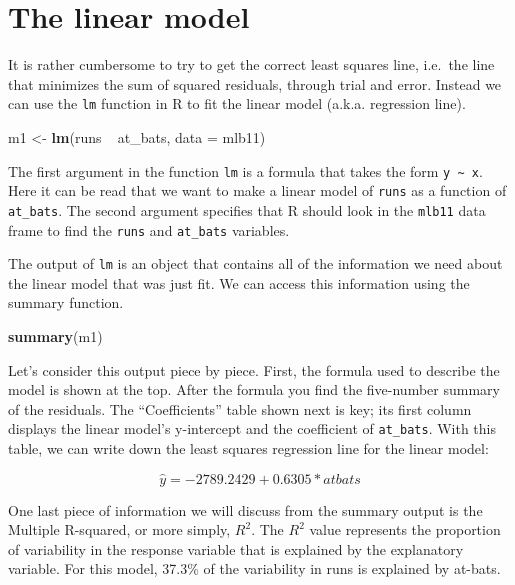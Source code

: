 \documentclass[]{book}
\newenvironment{Shaded}{\begin{snugshade}}{\end{snugshade}}
\newcommand{\KeywordTok}[1]{\textcolor[rgb]{0.13,0.29,0.53}{\textbf{{#1}}}}
\newcommand{\DataTypeTok}[1]{\textcolor[rgb]{0.13,0.29,0.53}{{#1}}}
\newcommand{\StringTok}[1]{\textcolor[rgb]{0.31,0.60,0.02}{{#1}}}
\newcommand{\NormalTok}[1]{{#1}}
\theoremstyle{definition}
\theoremstyle{definition}
\theoremstyle{remark}
\begin{document}
\section*{The linear model}\label{the-linear-model}

It is rather cumbersome to try to get the correct least squares line,
i.e.~the line that minimizes the sum of squared residuals, through trial
and error. Instead we can use the \texttt{lm} function in R to fit the
linear model (a.k.a. regression line).

\begin{Shaded}
\begin{Highlighting}[]
\NormalTok{m1 <-}\StringTok{ }\KeywordTok{lm}\NormalTok{(runs ~}\StringTok{ }\NormalTok{at_bats, }\DataTypeTok{data =} \NormalTok{mlb11)}
\end{Highlighting}
\end{Shaded}

The first argument in the function \texttt{lm} is a formula that takes
the form \texttt{y\ \textasciitilde{}\ x}. Here it can be read that we
want to make a linear model of \texttt{runs} as a function of
\texttt{at\_bats}. The second argument specifies that R should look in
the \texttt{mlb11} data frame to find the \texttt{runs} and
\texttt{at\_bats} variables.

The output of \texttt{lm} is an object that contains all of the
information we need about the linear model that was just fit. We can
access this information using the summary function.

\begin{Shaded}
\begin{Highlighting}[]
\KeywordTok{summary}\NormalTok{(m1)}
\end{Highlighting}
\end{Shaded}

Let's consider this output piece by piece. First, the formula used to
describe the model is shown at the top. After the formula you find the
five-number summary of the residuals. The ``Coefficients'' table shown
next is key; its first column displays the linear model's y-intercept
and the coefficient of \texttt{at\_bats}. With this table, we can write
down the least squares regression line for the linear model:

\[
  \hat{y} = -2789.2429 + 0.6305 * atbats
\]

One last piece of information we will discuss from the summary output is
the Multiple R-squared, or more simply, \(R^2\). The \(R^2\) value
represents the proportion of variability in the response variable that
is explained by the explanatory variable. For this model, 37.3\% of the
variability in runs is explained by at-bats.
\end{document}
